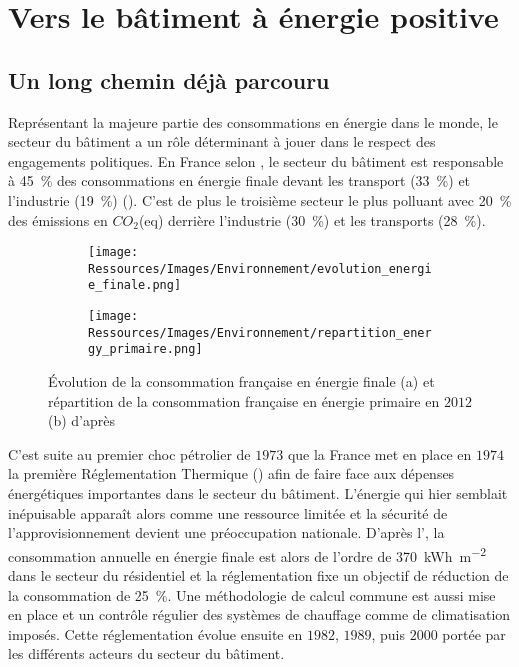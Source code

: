 \section{Vers le bâtiment à énergie positive} %
\label{sec:vers_le_batiment_a_energie_positive}
\subsection{Un long chemin déjà parcouru} %
\label{sub:un_long_chemin_deja_parcouru}
Représentant la majeure partie des consommations en énergie dans le monde, le secteur du
bâtiment a un rôle déterminant à jouer dans le respect des engagements politiques. En
France selon \textcite{ADEME2015}, le secteur du bâtiment est responsable à
\SI{45}{\percent} des consommations en énergie finale devant les transport
(\SI{33}{\percent}) et l’industrie (\SI{19}{\percent})
(). C’est de plus le troisième secteur le plus
polluant avec \SI{20}{\percent} des émissions en $CO_{2}$(eq) derrière
l’industrie (\SI{30}{\percent}) et les transports (\SI{28}{\percent}).


\begin{figure}
    \centering
    \begin{subfigure}{0.45\textwidth}
        \texttt{[image: Ressources/Images/Environnement/evolution\_energie\_finale.png]}
        \caption{}
        \label{fig:evolution_energy_finale}
    \end{subfigure}
    \quad
    \begin{subfigure}{0.45\textwidth}
        \texttt{[image: Ressources/Images/Environnement/repartition\_energy\_primaire.png]}
        \caption{}
        \label{fig:repartition_conso_primaire}
    \end{subfigure}
    \caption[Description du secteur énergétique français]
             {Évolution de la consommation française en énergie finale (a) et
              répartition de la consommation française en énergie primaire en $2012$ (b)
              d’après \textcite{ADEME2015}}
    \label{fig:energy_france}
\end{figure}

C’est suite au premier choc pétrolier de $1973$ que la France met en place en $1974$ la première
Réglementation Thermique () afin de faire face aux dépenses énergétiques importantes
dans le secteur du bâtiment. L’énergie qui hier semblait inépuisable apparaît
alors comme une ressource limitée et la sécurité de l’approvisionnement devient une
préoccupation nationale. D’après l’, la consommation annuelle en énergie finale est
alors de l’ordre de \SI{370}{kWh\per\metre\squared} dans le secteur du résidentiel et la
réglementation fixe un objectif de réduction de la consommation de
\SI{25}{\percent}. Une méthodologie de calcul commune est aussi mise en place et
un contrôle régulier des systèmes de chauffage comme de climatisation imposés.
Cette réglementation évolue ensuite en $1982$, $1989$, puis $2000$ portée par
les différents acteurs du secteur du bâtiment.

